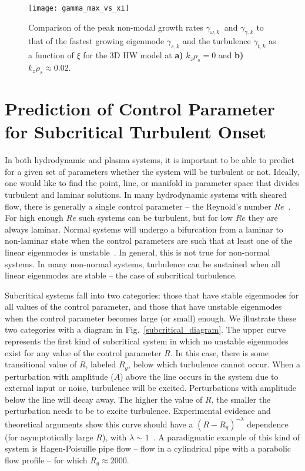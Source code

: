 \documentclass[twocolumn,showkeys,superscriptaddress]{revtex4}
\begin{document}
\begin{figure}
\centerline{\texttt{[image: gamma\_max\_vs\_xi]}}
\caption{Comparison of the peak non-modal growth rates $\gamma_{\omega,k} \ $ and $\gamma_{\gamma,k}$ to that of the fastest growing eigenmode $\gamma_{s,k}$ 
and the turbulence $\gamma_{t,k}$ as a function of $\xi$ for the 3D HW model at {\bf a)} $k_z \rho_s = 0$ and {\bf b)} $k_z \rho_s \approx 0.02$. }
\label{gamma_max_vs_xi}
\end{figure}

\section{Prediction of Control Parameter for Subcritical Turbulent Onset}
\label{sec_subcrit_prediction}

In both hydrodynamic and plasma systems, it is important to be able to predict for a given set of parameters whether the system will be turbulent or not.
Ideally, one would like to find the point, line, or manifold in parameter space that divides turbulent and laminar solutions.
In many hydrodynamic systems with sheared flow, there is generally a single control parameter -- the Reynold's number $Re$~\cite{drazin1981}. For high enough $Re$ such systems
can be turbulent, but for low $Re$ they are always laminar.
Normal systems will undergo a bifurcation from a laminar to non-laminar state when the control parameters are such that at least one of the linear eigenmodes is unstable~\cite{grossmann2000}.
In general, this is not true for non-normal systems. In many non-normal systems, turbulence can be sustained when all linear eigenmodes are stable -- the case of subcritical turbulence. 

Subcritical systems fall into two categories: those that have stable eigenmodes for all values of the control parameter, and those that have unstable eigenmodes
when the control parameter becomes large (or small) enough. We illustrate these two categories with a diagram in Fig.~\ref{subcritical_diagram}. 
The upper curve represents the first kind of subcritical system in which no unstable eigenmodes exist for any value of the control parameter $R$. In this
case, there is some transitional value of $R$, labeled $R_g$, below
which turbulence cannot occur. When a perturbation with amplitude
($A$) above the line occurs in the system due to external input or noise, 
turbulence will be excited. Perturbations with amplitude below the line will decay away. The higher the value of $R$, the smaller the perturbation needs to be to excite turbulence.
Experimental evidence and theoretical arguments show this curve should have a $(R-R_g)^{-\lambda}$ dependence (for asymptotically large $R$), with $\lambda \sim 1$~\cite{waleffe1995b,grossmann2000,hof2003}.
A paradigmatic example of this kind of system is Hagen-Poisuille pipe flow -- flow in a cylindrical pipe with a parabolic flow profile -- for which $R_g \approx 2000$.
\end{document}
